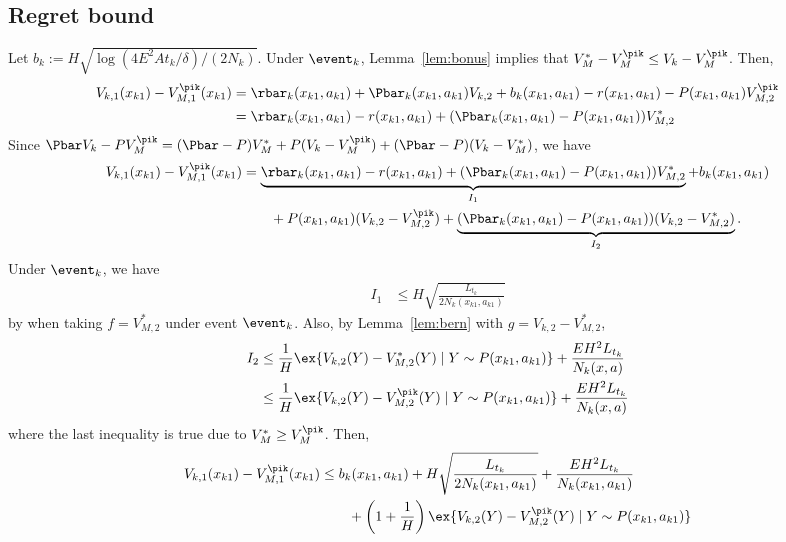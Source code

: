         \subsection{Regret bound}
        \label{subsec:regret_ucbvi}
        
        Let $b_k:=H\sqrt{\log(4E^2At_k/\delta)/(2N_k)}$. Under $\event_k$, Lemma~\ref{lem:bonus} implies that $V_M^*-V_M^{\pik} \le V_{k}-V_M^{\pik}$.
        Then,
        \begin{align*}
        V_{k,1}(x_{k1}) -V_{M,1}^{\pik}(x_{k1})
        &=\rbar_k(x_{k1},a_{k1}) +\Pbar_k(x_{k1},a_{k1})V_{k,2} +b_k(x_{k1},a_{k1}) -r(x_{k1},a_{k1}) -P(x_{k1},a_{k1})V_{M,2}^{\pik} \\
        &=\rbar_k(x_{k1},a_{k1}) -r(x_{k1},a_{k1}) +(\Pbar_k(x_{k1},a_{k1}) -P(x_{k1},a_{k1}))V_{M,2}^*
        \end{align*}
        Since $\Pbar V_k -PV_M^{\pik}=(\Pbar-P)V_M^* +P(V_k-V_M^{\pik}) +(\Pbar-P)(V_k-V_M^*)$, we have
        \begin{align*}
        V_{k,1}(x_{k1}) -V_{M,1}^{\pik}(x_{k1})
        &=\underbrace{\rbar_k(x_{k1},a_{k1}) -r(x_{k1},a_{k1}) +(\Pbar_k(x_{k1},a_{k1}) -P(x_{k1},a_{k1}))V_{M,2}^*}_{I_1} +b_k(x_{k1},a_{k1}) \\
        &\qquad +P(x_{k1},a_{k1})(V_{k,2}-V_{M,2}^{\pik}) +\underbrace{(\Pbar_k(x_{k1},a_{k1})-P(x_{k1},a_{k1}))(V_{k,2}-V_{M,2}^*)}_{I_2}.
        \end{align*}
        Under $\event_k$, we have
        \begin{align*}
        I_1&\le H\sqrt{\frac{L_{t_k}}{2N_k(x_{k1},a_{k1})}}
        \end{align*}
        by when taking $f=V_{M,2}^{*}$ under event $\event_k$.
        Also, by Lemma~\ref{lem:bern} with $g=V_{k,2} -V_{M,2}^{*}$,
        \begin{align*}
        I_2
        &\le\frac1{H}\ex{V_{k,2}(Y) -V_{M,2}^{*}(Y) \mid Y\sim P(x_{k1}, a_{k1})} +\frac{EH^2L_{t_k}}{N_k(x,a)} \\
        &\le\frac1{H}\ex{V_{k,2}(Y) -V_{M,2}^{\pik}(Y) \mid Y\sim P(x_{k1}, a_{k1})} +\frac{EH^2L_{t_k}}{N_k(x,a)}
        \end{align*}
        where the last inequality is true due to $V^*_M\ge V^{\pik}_{M}$.
        Then,
        \begin{align*}
        V_{k,1}(x_{k1}) -V_{M,1}^{\pik}(x_{k1})
        &\le b_k(x_{k1},a_{k1}) +H\sqrt{\frac{L_{t_k}}{2N_k(x_{k1},a_{k1})}} +\frac{EH^2L_{t_k}}{N_k(x_{k1},a_{k1})} \\
        &\qquad +\left(1+\frac1H\right)\ex{V_{k,2}(Y) -V_{M,2}^{\pik}(Y) \mid Y\sim P(x_{k1}, a_{k1})}
        \end{align*}

